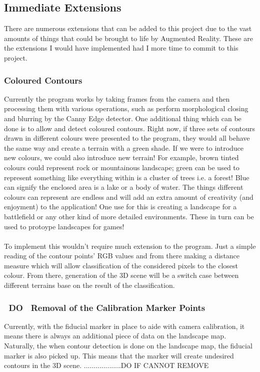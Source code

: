 \documentclass[11pt]{article}
\begin{document}
\subsection{Immediate Extensions}
There are numerous extensions that can be added to this project due to the 
vast amounts of things that could be brought to life by Augmented Reality.
These are the extensions I would have implemented had I more time to commit
to this project.

\subsubsection{Coloured Contours}
Currently the program works by taking frames from the camera and then   
processing them with various operations, such as perform morphological
closing and blurring by the Canny Edge detector. One additional thing 
which can be done is to allow and detect coloured contours. Right now,
if three sets of contours drawn in different colours were presented to
the program, they would all behave the same way and create a terrain
with a green shade. If we were to introduce new colours, we could also
introduce new terrain! For example, brown tinted colours could represent
rock or mountainous landscape; green can be used to represent something like
everything within is a cluster of trees i.e. a forest! Blue can signify
the enclosed area is a lake or a body of water. The things different
colours can represent are endless and will add an extra amount of creativity
(and enjoyment) to the application! One use for this is creating a 
landscape for a battlefield or any other kind of more detailed environments.
These in turn can be used to protoype landscapes for games!\\
\\
To implement this wouldn't require much extension to the program. Just a simple
reading of the contour points' RGB values and from there making a distance 
measure which will allow classification of the considered pixels to the 
closest colour. From there, generation of the 3D scene will be a switch case 
between different terrains base on the result of the classification.

\subsubsection{~DO~ Removal of the Calibration Marker Points}
Currently, with the fiducial marker in place to aide with camera
calibration, it means there is always an additional piece of data on the 
landscape map. Naturally, the when contour detection is done on the
landscape map, the fiducial marker is also picked up. This means that the 
marker will create undesired contours in the 3D scene. 
...................DO IF CANNOT REMOVE
\end{document}
